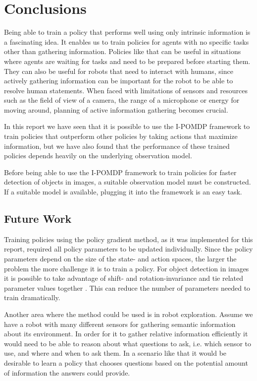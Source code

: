 
\chapter{Conclusions}
\label{ch:Conclusions}
Being able to train a policy that performs well using only intrinsic information is a fascinating idea. It enables us to train policies for agents with no specific tasks other than gathering information. Policies like that can be useful in situations where agents are waiting for tasks and need to be prepared before starting them. They can also be useful for robots that need to interact with humans, since actively gathering information can be important for the robot to be able to resolve human statements. When faced with limitations of sensors and resources such as the field of view of a camera, the range of a microphone or energy for moving around, planning of active information gathering becomes crucial.

In this report we have seen that it is possible to use the I-POMDP framework to train policies that outperform other policies by taking actions that maximize information, but we have also found that the performance of these trained policies depends heavily on the underlying observation model.

Before being able to use the I-POMDP framework to train policies for faster detection of objects in images, a suitable observation model must be constructed. If a suitable model is available, plugging it into the framework is an easy task.

\section{Future Work}
Training policies using the policy gradient method, as it was implemented for this report, required all policy parameters to be updated individually. Since the policy parameters depend on the size of the state- and action spaces, the larger the problem the more challenge it is to train a policy. For object detection in images it is possible to take advantage of shift- and rotation-invariance and tie related parameter values together \cite{Butko2010b}. This can reduce the number of parameters needed to train dramatically.

Another area where the method could be used is in robot exploration. Assume we have a robot with many different sensors for gathering semantic information about its environment. In order for it to gather relative information efficiently it would need to be able to reason about what questions to ask, i.e. which sensor to use, and where and when to ask them. In a scenario like that it would be desirable to learn a policy that chooses questions based on the potential amount of information the answers could provide.
